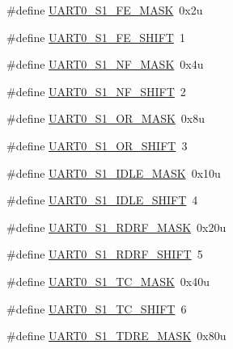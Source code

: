 \begin{DoxyCompactItemize}
\item 
\#define \hyperlink{group___u_a_r_t0___register___masks_ga1c5be37bf4810fa33dc4a55ff08bb330}{U\+A\+R\+T0\+\_\+\+S1\+\_\+\+F\+E\+\_\+\+M\+A\+SK}~0x2u
\item 
\#define \hyperlink{group___u_a_r_t0___register___masks_ga7875ba67c717eabba8e99c077b3ed956}{U\+A\+R\+T0\+\_\+\+S1\+\_\+\+F\+E\+\_\+\+S\+H\+I\+FT}~1
\item 
\#define \hyperlink{group___u_a_r_t0___register___masks_ga8d428cf6cbd42d46556eb94a1ba90c96}{U\+A\+R\+T0\+\_\+\+S1\+\_\+\+N\+F\+\_\+\+M\+A\+SK}~0x4u
\item 
\#define \hyperlink{group___u_a_r_t0___register___masks_ga345c1c8f761fe45de1be741a581f298b}{U\+A\+R\+T0\+\_\+\+S1\+\_\+\+N\+F\+\_\+\+S\+H\+I\+FT}~2
\item 
\#define \hyperlink{group___u_a_r_t0___register___masks_gafe263b65f56ebb135d82f6f380d92503}{U\+A\+R\+T0\+\_\+\+S1\+\_\+\+O\+R\+\_\+\+M\+A\+SK}~0x8u
\item 
\#define \hyperlink{group___u_a_r_t0___register___masks_ga30b721ac10d936a50f083dd8edf63793}{U\+A\+R\+T0\+\_\+\+S1\+\_\+\+O\+R\+\_\+\+S\+H\+I\+FT}~3
\item 
\#define \hyperlink{group___u_a_r_t0___register___masks_gab6f26cdc2089161970bbd6d77daf345b}{U\+A\+R\+T0\+\_\+\+S1\+\_\+\+I\+D\+L\+E\+\_\+\+M\+A\+SK}~0x10u
\item 
\#define \hyperlink{group___u_a_r_t0___register___masks_gac68bfcf79c38331eb53678c7578e5937}{U\+A\+R\+T0\+\_\+\+S1\+\_\+\+I\+D\+L\+E\+\_\+\+S\+H\+I\+FT}~4
\item 
\#define \hyperlink{group___u_a_r_t0___register___masks_gabfc8c446e35e26275bc966d2a9c50115}{U\+A\+R\+T0\+\_\+\+S1\+\_\+\+R\+D\+R\+F\+\_\+\+M\+A\+SK}~0x20u
\item 
\#define \hyperlink{group___u_a_r_t0___register___masks_ga64f8830cd7e5c3c69d91f4747137f323}{U\+A\+R\+T0\+\_\+\+S1\+\_\+\+R\+D\+R\+F\+\_\+\+S\+H\+I\+FT}~5
\item 
\#define \hyperlink{group___u_a_r_t0___register___masks_ga0d63e21fc62457b6a441c82d0ed21980}{U\+A\+R\+T0\+\_\+\+S1\+\_\+\+T\+C\+\_\+\+M\+A\+SK}~0x40u
\item 
\#define \hyperlink{group___u_a_r_t0___register___masks_ga00448db2843a19047ebd7ae86f2cb1fd}{U\+A\+R\+T0\+\_\+\+S1\+\_\+\+T\+C\+\_\+\+S\+H\+I\+FT}~6
\item 
\#define \hyperlink{group___u_a_r_t0___register___masks_ga54aac82fa657a6a49064908004abc80d}{U\+A\+R\+T0\+\_\+\+S1\+\_\+\+T\+D\+R\+E\+\_\+\+M\+A\+SK}~0x80u
\item 

\end{DoxyCompactItemize}
